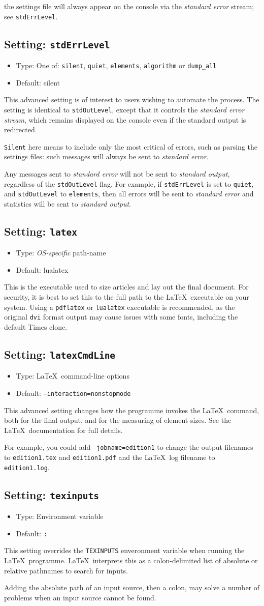 \documentclass[a4paper,DIV=11]{scrartcl}
\newcommand{\property}[5]{
  \subsection{#1: \texttt{#2}}
  \begin{itemize}
  \item Type: #3
  \item Default: #4
  \end{itemize}
  #5
}
\newcommand{\setting}{\property{Setting}}
\begin{document}
\begin{multicols}{2}
{  the settings file will always appear on the console via the
  \textit{standard error} stream; see \texttt{stdErrLevel}.
}
\setting{stdErrLevel}{One of: \texttt{silent}, \texttt{quiet}, \texttt{elements},
  \texttt{algorithm} or \texttt{dump\_all}}{silent}{
  This advanced setting is of interest to users wishing to automate
  the process. The setting is identical to \texttt{stdOutLevel},
  except that it controls the \textit{standard error stream}, which
  remains displayed on the console even if the standard output is
  redirected.\par
  \texttt{Silent} here means to include only the most critical of
  errors, such as parsing the settings files: such messages will
  always be sent to \textit{standard error}. \par
  Any messages sent to \textit{standard error} will not be sent to
  \textit{standard output}, regardless of the \texttt{stdOutLevel}
  flag. For example, if \texttt{stdErrLevel} is set to
  \texttt{quiet}, and \texttt{stdOutLevel} to \texttt{elements}, then
  all errors will be sent to \textit{standard error} and statistics
  will be sent to \textit{standard output}.
}
\setting{latex}{\textit{OS-specific} path-name}{lualatex}{This is the executable used to
  size articles and lay out the final document. For security, it is
  best to set this to the full path to the \LaTeX\ executable on your
  system. Using a \texttt{pdflatex} or \texttt{lualatex} executable is
  recommended, as the original \texttt{dvi} format output may cause
  issues with some fonts, including the default Times clone.}
\setting{latexCmdLine}{\LaTeX\ command-line options}{\texttt{--interaction=nonstopmode}}{
  This advanced setting changes how the programme invokes the
  \LaTeX\ command, both for the final output, and for the measuring of
  element sizes. See the \LaTeX\ documentation for full details.\par
  For example, you could add \texttt{-jobname=edition1} to change the
  output filenames to \texttt{edition1.tex} and \texttt{edition1.pdf} and
  the \LaTeX\ log filename to \texttt{edition1.log}.
}
\setting{texinputs}{Environment variable}{\texttt{:}}{This setting
  overrides the \texttt{TEXINPUTS} enveronment variable when running
  the \LaTeX\ programme. \LaTeX\ interprets this as a colon-delimited
  list of absolute or relative pathnames to search for inputs.\par
  Adding the absolute path of an input source, then a colon, may solve a number of
  problems when an input source cannot be found.\par
}
\end{multicols}
\end{document}
